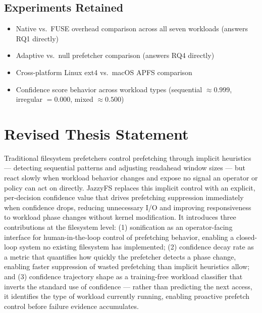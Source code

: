 \documentclass[12pt]{article}
\begin{document}
\subsection*{Experiments Retained}

\begin{itemize}
    \item Native vs.\ FUSE overhead comparison across all seven workloads
    (answers RQ1 directly)
    \item Adaptive vs.\ null prefetcher comparison (answers RQ4 directly)
    \item Cross-platform Linux ext4 vs.\ macOS APFS comparison
    \item Confidence score behavior across workload types
    (sequential $\approx 0.999$, irregular $= 0.000$, mixed $\approx 0.500$)
\end{itemize}

\section*{Revised Thesis Statement}

Traditional filesystem prefetchers control prefetching through implicit
heuristics --- detecting sequential patterns and adjusting readahead window
sizes --- but react slowly when workload behavior changes and expose no signal
an operator or policy can act on directly. JazzyFS replaces this implicit
control with an explicit, per-decision confidence value that drives prefetching
suppression immediately when confidence drops, reducing unnecessary I/O and
improving responsiveness to workload phase changes without kernel modification.
It introduces three contributions at the filesystem level: (1) sonification as
an operator-facing interface for human-in-the-loop control of prefetching
behavior, enabling a closed-loop system no existing filesystem has implemented;
(2) confidence decay rate as a metric that quantifies how quickly the prefetcher
detects a phase change, enabling faster suppression of wasted prefetching than
implicit heuristics allow; and (3) confidence trajectory shape as a
training-free workload classifier that inverts the standard use of confidence
--- rather than predicting the next access, it identifies the type of workload
currently running, enabling proactive prefetch control before failure evidence
accumulates.
\end{document}
